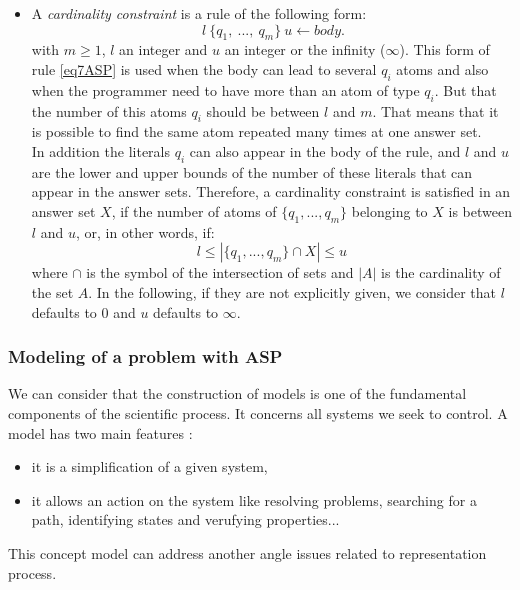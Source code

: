\begin{enumerate}
\begin{itemize}
\item A \emph{cardinality constraint} is a rule of the following form:
\begin{equation} 
 ~ l ~\{q_{1},~ ... ,~ q_{m}\}~ u \leftarrow body.
 \label{eq7ASP}
\end{equation}
with $m \geq 1$, $l$ an integer and $u$ an integer or the infinity ($\infty$). This form of rule \ref{eq7ASP} is used when the body can lead to several $q_i$ atoms and also when the programmer need to have more than an atom of type $q_i$. But that the number of this atoms $q_i$ should be between $l$ and $m$. That means that it is possible to find the same atom repeated many times at one answer set.\\
In addition the literals $q_i$ can also appear in the body of the rule,
and $l$ and $u$ are the lower and upper bounds of the number of these literals
that can appear in the answer sets.
Therefore, a cardinality constraint is satisfied in an answer set $X$, if the number of atoms of $\{q_{1}, ... , q_{m}\}$ belonging to $X$ is between $l$ and $u$,
or, in other words, if:
\begin{equation}
  l \leq | \{q_{1},... , q_{m}\} \cap X | \leq u
\end{equation}
where $\cap$ is the symbol of the intersection of sets
and $|A|$ is the cardinality of the set $A$.
In the following, if they are not explicitly given,
we consider that $l$ defaults to $0$ and $u$ defaults to $\infty$.

\end{itemize}

\end{enumerate}



\subsubsection{Modeling of a problem with ASP}

We can consider that the construction of models is one of the fundamental components of the scientific process. It concerns all systems we seek to control. A model has two main features \cite{Glimpse}:
\begin{itemize}
\item it is a simplification of a given system,
\item it allows an action on the system like resolving problems, searching for a path, identifying states and verufying properties... 
\end{itemize}
This concept model can address another angle issues related to representation process.

